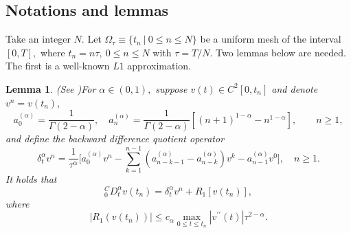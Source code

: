 \documentclass[11pt]{article}
\newtheorem{lem}[thm]{Lemma}
\begin{document}
\subsection{Notations and lemmas}


Take an integer $N.$ Let $\Omega_\tau\equiv \{ t_n~|~0\leq n\leq N\}$ be a uniform mesh of the interval $[0,T],$ where $t_n=n\tau,~0\leq n\leq N$ with $\tau=T/N.$   Two lemmas below are needed. The first is a well-known $L1$ approximation.
 \begin{lem}(See \cite{Sun2006})\label{dis-lem-sun-1}
For $\alpha \in (0,1), $ suppose $v(t) \in C^2[0,t_n]$ and denote $v^n=v(t_n),$
\begin{equation} 
a_0^{(\alpha)}=\frac{1}{\Gamma{(2-\alpha)}}, \quad  a_n^{(\alpha)}=
\frac{1}{\Gamma{(2-\alpha)}}[(n+1)^{1-\alpha}-n^{1-\alpha}],\qquad n\geq 1, \label{coefficients}\end{equation}
 and define the backward difference quotient operator
\begin{equation}\label{eq:def-al}
\delta_t^{\alpha}v^n= \frac{1}{ \tau^{\alpha} }\biggl[a_0^{(\alpha)}v^n- \sum_{k=1}^{n-1} (a_{n-k-1}^{(\alpha)}-a_{n-k}^{(\alpha)} )v^k -a_{n-1}^{(\alpha)}v^0\biggl],\quad n \geq 1.
\end{equation}
It holds that
\begin{equation}
_0^{C}D_t^{\alpha}v(t_n)=\delta_t^{\alpha}v^n +R_1[v(t_n)],
\end{equation}
where
$$|R_1(v(t_n))|\leq c_{\alpha}\max_{0\leq t\leq t_n}|v^{\prime\prime}(t)|\tau^{2-\alpha}. $$
\end{lem}
\end{document}
